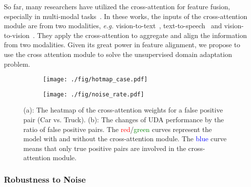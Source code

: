 \documentclass[dvipsnames, svgnames, x11names, table]{article} \usepackage{iclr2022_conference,times}
\begin{document}
\begin{spacing}{1.0}
So far, many researchers have utilized the cross-attention for feature fusion, especially in multi-modal tasks~\citep{tsai2019multimodal,li2019neural,hu2021unit,li2021trear}. In these works, the inputs of the cross-attention module are from two modalities, \textit{e.g.} vision-to-text~\citep{tsai2019multimodal,hu2021unit}, text-to-speech~\citep{li2019neural} and vision-to-vision~\citep{li2021trear}. They apply the cross-attention to aggregate and align the information from two modalities. Given its great power in feature alignment, we propose to use the cross attention module to solve the unsupervised domain adaptation problem.



\begin{figure}[!t]
\centering
\begin{subfigure}[c]{0.54\textwidth}
\centering
\texttt{[image: ./fig/hotmap\_case.pdf]}
\vspace{-5mm}
\caption{}
\vspace{-3mm}
\label{fig:noisecase}
\end{subfigure}
\hfill
\begin{subfigure}[c]{0.44\textwidth}
\centering
\texttt{[image: ./fig/noise\_rate.pdf]}
\vspace{-5mm}
\caption{}
\vspace{-3mm}
\label{fig:noisecurve}
\end{subfigure}
\caption{(a): The heatmap of the cross-attention weights for a false positive pair (Car vs. Truck). (b): The changes of UDA performance by the ratio of false positive pairs. The \textcolor{red}{red}/\textcolor{Green}{green} curves represent the model with and without the cross-attention module. The \textcolor{blue}{blue} curve means that only true positive pairs are involved in the cross-attention module.}
\vspace{-3mm}
\end{figure}

\subsubsection{Robustness to Noise}



\end{spacing}
\end{document}
